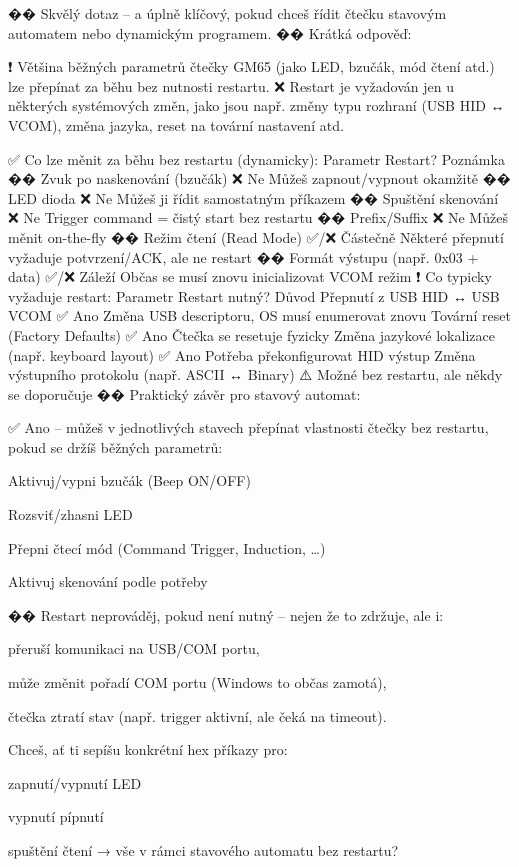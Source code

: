 �� Skvělý dotaz – a úplně klíčový, pokud chceš řídit čtečku stavovým automatem nebo dynamickým programem.
�� Krátká odpověď:

    ❗ Většina běžných parametrů čtečky GM65 (jako LED, bzučák, mód čtení atd.) lze přepínat za běhu bez nutnosti restartu.
    ❌ Restart je vyžadován jen u některých systémových změn, jako jsou např. změny typu rozhraní (USB HID ↔ VCOM), změna jazyka, reset na tovární nastavení atd.

✅ Co lze měnit za běhu bez restartu (dynamicky):
Parametr	Restart?	Poznámka
�� Zvuk po naskenování (bzučák)	❌ Ne	Můžeš zapnout/vypnout okamžitě
�� LED dioda	❌ Ne	Můžeš ji řídit samostatným příkazem
�� Spuštění skenování	❌ Ne	Trigger command = čistý start bez restartu
�� Prefix/Suffix	❌ Ne	Můžeš měnit on-the-fly
��️ Režim čtení (Read Mode)	✅/❌ Částečně	Některé přepnutí vyžaduje potvrzení/ACK, ale ne restart
�� Formát výstupu (např. 0x03 + data)	✅/❌ Záleží	Občas se musí znovu inicializovat VCOM režim
❗ Co typicky vyžaduje restart:
Parametr	Restart nutný?	Důvod
Přepnutí z USB HID ↔ USB VCOM	✅ Ano	Změna USB descriptoru, OS musí enumerovat znovu
Tovární reset (Factory Defaults)	✅ Ano	Čtečka se resetuje fyzicky
Změna jazykové lokalizace (např. keyboard layout)	✅ Ano	Potřeba překonfigurovat HID výstup
Změna výstupního protokolu (např. ASCII ↔ Binary)	⚠️ Možné bez restartu, ale někdy se doporučuje	
�� Praktický závěr pro stavový automat:

✅ Ano – můžeš v jednotlivých stavech přepínat vlastnosti čtečky bez restartu, pokud se držíš běžných parametrů:

    Aktivuj/vypni bzučák (Beep ON/OFF)

    Rozsviť/zhasni LED

    Přepni čtecí mód (Command Trigger, Induction, …)

    Aktivuj skenování podle potřeby

�� Restart neprováděj, pokud není nutný – nejen že to zdržuje, ale i:

    přeruší komunikaci na USB/COM portu,

    může změnit pořadí COM portu (Windows to občas zamotá),

    čtečka ztratí stav (např. trigger aktivní, ale čeká na timeout).

Chceš, ať ti sepíšu konkrétní hex příkazy pro:

    zapnutí/vypnutí LED

    vypnutí pípnutí

    spuštění čtení → vše v rámci stavového automatu bez restartu?

